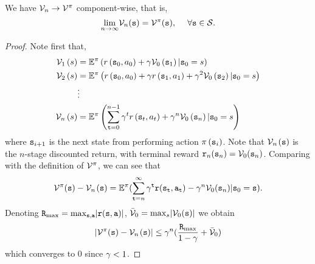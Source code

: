 \begin{proposition}\label{prop:FP_VI}
We have ${\mathcal{V}_n} \to \mathcal{V}_{}^\pi$ component-wise, that is,
\[{\lim _{n \to \infty }}{\mathcal{V}_n}({\tt s}) = \mathcal{V}_{}^\pi ({\tt s}),\quad \;\forall {\tt s} \in \mathcal{S}.\]
\end{proposition}
\begin{proof}
Note first that,
\begin{align*}
\mathcal{V}_{1}\left(s\right) & =\mathbb{E}^{\pi}\left(r\left({\tt s}_{0},a_{0}\right)+\gamma \mathcal{V}_{0}\left({\tt s}_{1}\right)|{\tt s}_{0}=s\right)\\
\mathcal{V}_{2}\left(s\right) & =\mathbb{E}^{\pi}\left(r\left({\tt s}_{0},a_{0}\right)+\gamma r\left({\tt s}_{1},a_{1}\right)+\gamma^{2}\mathcal{V}_{0}\left({\tt s}_{2}\right)|{\tt s}_{0}=s\right)\\
 & \vdots\\
\mathcal{V}_{n}\left(s\right) & =\mathbb{E}^{\pi}\left(\sum_{{\tt t}=0}^{n-1}\gamma^{t}r\left({\tt s}_{t},a_{t}\right)+\gamma^{n}\mathcal{V}_{0}\left({\tt s}_{n}\right)|{\tt s}_{0}=s\right)
\end{align*}
where ${\tt s}_{i+1}$ is the next state from performing action $\pi\left({\tt s}_{i}\right)$.
Note that ${\mathcal{V}_n}{\kern 1pt} ({\tt s})$ is the $n$-stage
discounted return, with terminal reward ${{\tt r}_n}({{\tt s}_n}) =
{\mathcal{V}_0}({{\tt s}_n})$. Comparing with the definition of
$\mathcal{V}_{}^\pi $, we can see that
\[{\mathcal{V}^\pi }({\tt s}) - {\mathcal{V}_n}{\kern 1pt} ({\tt s}) = {\mathbb{E}^\pi }(\sum\limits_{{\tt t} = n}^\infty  {{\gamma^{\tt t}}{\tt r}({{\tt s}_{\tt t}},{{\tt a}_{\tt t}})}  - {\gamma ^n}{\mathcal{V}_0}({{\tt s}_n})|{{\tt s}_0} = {\tt s}).\]
Denoting ${\tt R}_{\max } = {\max
_{{\tt s},{\tt a}}}|{\tt r}({\tt s},{\tt a})|$, ${\bar {\mathcal{V}}_0} =
{\max _s}|\mathcal{V}_0({\tt s})|$ we obtain
\[|{\mathcal{V}^\pi }({\tt s}) - {\mathcal{V}_n}{\kern 1pt} ({\tt s})| \le {\gamma^n}(\frac{{{\tt R}_{\max }}}{{1 - \gamma }} + {\bar {\mathcal{V}}_0})\]
which converges to 0 since $\gamma  < 1$.
\end{proof}

